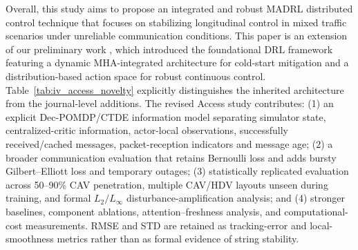 \documentclass{ieeeaccess}
\begin{document}
Overall, this study aims to propose an integrated and robust MADRL distributed control technique that focuses on stabilizing longitudinal control in mixed traffic scenarios under unreliable communication conditions. This paper is an extension of our preliminary work \cite{cai2026integrating}, which introduced the foundational DRL framework featuring a dynamic MHA-integrated architecture for cold-start mitigation and a distribution-based action space for robust continuous control. Table~\ref{tab:iv_access_novelty} explicitly distinguishes the inherited architecture from the journal-level additions. The revised Access study contributes: (1) an explicit Dec-POMDP/CTDE information model separating simulator state, centralized-critic information, actor-local observations, successfully received/cached messages, packet-reception indicators and message age; (2) a broader communication evaluation that retains Bernoulli loss and adds bursty Gilbert--Elliott loss and temporary outages; (3) statistically replicated evaluation across 50--90\% CAV penetration, multiple CAV/HDV layouts unseen during training, and formal $L_2/L_\infty$ disturbance-amplification analysis; and (4) stronger baselines, component ablations, attention--freshness analysis, and computational-cost measurements. RMSE and STD are retained as tracking-error and local-smoothness metrics rather than as formal evidence of string stability.
\end{document}
